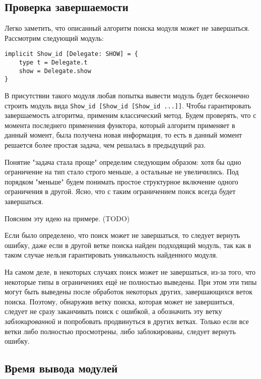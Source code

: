 \documentclass[../diploma.tex]{subfiles}
\begin{document}
\label{sec:2}

\subsection{Проверка завершаемости}

Легко заметить, что описанный алгоритм поиска модуля может не завершаться. Рассмотрим следующий модуль:

\begin{verbatim}
implicit Show_id [Delegate: SHOW] = {
    type t = Delegate.t
    show = Delegate.show
}
\end{verbatim}

В присутствии такого модуля любая попытка вывести модуль будет бесконечно строить модуль вида \texttt{Show_id [Show_id [Show_id ...]]}. Чтобы гарантировать завершаемость алгоритма, применим классический метод. Будем проверять, что с момента последнего применения функтора, который алгоритм применяет в данный момент, была получена новая информация, то есть в данный момент решается более простая задача, чем решалась в предыдущий раз.

Понятие "задача стала проще" определим следующим образом: хотя бы одно ограничение на тип стало строго меньше, а остальные не увеличились. Под порядком "меньше" будем понимать простое структурное включение одного ограничения в другой. Ясно, что с таким ограничением поиск всегда будет завершаться.

Поясним эту идею на примере. (TODO)

Если было определено, что поиск может не завершаться, то следует вернуть ошибку, даже если в другой ветке поиска найден подходящий модуль, так как в таком случае нельзя гарантировать уникальность найденного модуля.

На самом деле, в некоторых случаях поиск может не завершаться, из-за того, что некоторые типы в ограничениях ещё не полностью выведены. При этом эти типы могут быть выведены после обработок некоторых других, завершающихся веток поиска. Поэтому, обнаружив ветку поиска, которая может не завершиться, следует не сразу заканчивать поиск с ошибкой, а обозначить эту ветку \textit{заблокированной} и попробовать продвинуться в других ветках. Только если все ветки либо полностью просмотрены, либо заблокированы, следует вернуть ошибку.

\subsection{Время вывода модулей}
\end{document}
